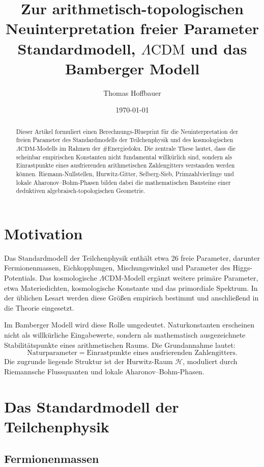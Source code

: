\documentclass[11pt,a4paper]{article}
\title{\textbf{Zur arithmetisch-topologischen Neuinterpretation freier Parameter}\\
\large Standardmodell, \texorpdfstring{$\Lambda\mathrm{CDM}$}{Lambda-CDM} und das Bamberger Modell}
\author{Thomas Hoffbauer}
\date{\today}
\begin{document}
\maketitle

\begin{abstract}
Dieser Artikel formuliert einen Berechnungs-Blueprint für die Neuinterpretation der freien
Parameter des Standardmodells der Teilchenphysik und des kosmologischen
$\Lambda\mathrm{CDM}$-Modells im Rahmen der \#Energiedoku. Die zentrale These lautet, dass
die scheinbar empirischen Konstanten nicht fundamental willkürlich sind, sondern als
Einrastpunkte eines ausfrierenden arithmetischen Zahlengitters verstanden werden können.
Riemann-Nullstellen, Hurwitz-Gitter, Selberg-Sieb, Primzahlvierlinge und lokale
Aharonov--Bohm-Phasen bilden dabei die mathematischen Bausteine einer deduktiven
algebraisch-topologischen Geometrie.
\end{abstract}

\section{Motivation}

Das Standardmodell der Teilchenphysik enthält etwa 26 freie Parameter, darunter
Fermionenmassen, Eichkopplungen, Mischungswinkel und Parameter des Higgs-Potentials.
Das kosmologische $\Lambda\mathrm{CDM}$-Modell ergänzt weitere primäre Parameter, etwa
Materiedichten, kosmologische Konstante und das primordiale Spektrum. In der üblichen
Lesart werden diese Größen empirisch bestimmt und anschließend in die Theorie eingesetzt.

Im Bamberger Modell wird diese Rolle umgedeutet. Naturkonstanten erscheinen nicht als
willkürliche Eingabewerte, sondern als mathematisch ausgezeichnete Stabilitätspunkte eines
arithmetischen Raums. Die Grundannahme lautet:
\[
  \text{Naturparameter}
  =
  \text{Einrastpunkte eines ausfrierenden Zahlengitters}.
\]
Die zugrunde liegende Struktur ist der Hurwitz-Raum $\mathcal{H}$, moduliert durch
Riemannsche Flussquanten und lokale Aharonov--Bohm-Phasen.

\section{Das Standardmodell der Teilchenphysik}

\subsection{Fermionenmassen}
\end{document}
